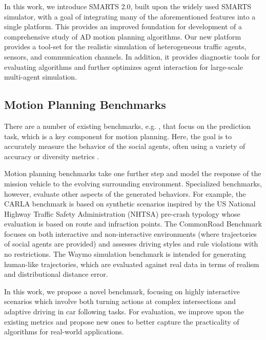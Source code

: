In this work, we introduce SMARTS 2.0, built upon the widely used SMARTS \cite{zhou2020smarts} simulator, with a goal of integrating many of the aforementioned features into a single platform. This provides an improved foundation for development of a comprehensive study of AD motion planning algorithms. Our new platform provides a tool-set for the realistic simulation of heterogeneous traffic agents, sensors, and communication channels. In addition, it provides diagnostic tools for evaluating algorithms and further optimizes agent interaction for large-scale multi-agent simulation.

\subsection{Motion Planning Benchmarks}
There are a number of existing benchmarks, e.g. \cite{houston2021one, caesar2020nuscenes, Wilson_Argoverse2}, that focus on the prediction task, which is a key component for motion planning. Here, the goal is to accurately measure the behavior of the social agents, often using a variety of accuracy or diversity metrics \cite{chen2024criteria}. 

Motion planning benchmarks \cite{rasouli2023driving, althoff2017commonroad, Sun_2020_CVPR, Ansys_comp, TPCAP_comp} take one further step and model the response of the mission vehicle to the evolving surrounding environment. Specialized benchmarks, however, evaluate other aspects of the generated behaviors. For example, the CARLA benchmark \cite{dosovitskiy2017carla} is based on synthetic scenarios inspired by the US National Highway Traffic Safety Administration (NHTSA) pre-crash typology whose evaluation is based on route and infraction points. The CommonRoad Benchmark \cite{althoff2017commonroad} focuses on both interactive and non-interactive environments (where trajectories of social agents are provided) and assesses driving styles and rule violations with no restrictions. The Waymo simulation benchmark \cite{Sun_2020_CVPR} is intended for generating human-like trajectories, which are evaluated against real data in terms of realism and distributional distance error. 

In this work, we propose a novel benchmark, focusing on highly interactive scenarios which involve both turning actions at complex intersections and adaptive driving in car following tasks. For evaluation, we improve upon the existing metrics and propose new ones to better capture the practicality of algorithms for real-world applications.